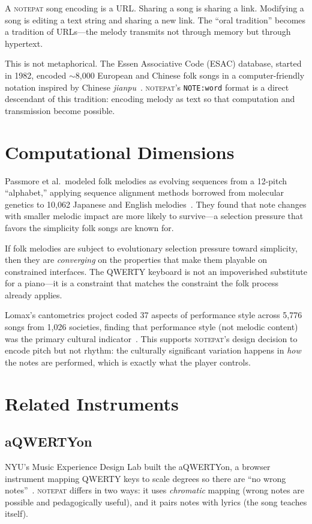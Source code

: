 \documentclass[10pt,letterpaper,twocolumn]{article}
\newcommand{\np}{\textsc{notepat}}
\begin{document}
A \np{} song encoding is a URL. Sharing a song is sharing a link. Modifying a song is editing a text string and sharing a new link. The ``oral tradition'' becomes a tradition of URLs---the melody transmits not through memory but through hypertext.

This is not metaphorical. The Essen Associative Code (ESAC) database, started in 1982, encoded $\sim$8,000 European and Chinese folk songs in a computer-friendly notation inspired by Chinese \textit{jianpu}~\citep{schaffrath1995esac}. \np{}'s \texttt{NOTE:word} format is a direct descendant of this tradition: encoding melody as text so that computation and transmission become possible.

\section{Computational Dimensions}

Passmore et al.\ modeled folk melodies as evolving sequences from a 12-pitch ``alphabet,'' applying sequence alignment methods borrowed from molecular genetics to 10,062 Japanese and English melodies~\citep{passmore2023cultural}. They found that note changes with smaller melodic impact are more likely to survive---a selection pressure that favors the simplicity folk songs are known for.

If folk melodies are subject to evolutionary selection pressure toward simplicity, then they are \emph{converging} on the properties that make them playable on constrained interfaces. The QWERTY keyboard is not an impoverished substitute for a piano---it is a constraint that matches the constraint the folk process already applies.

Lomax's cantometrics project coded 37 aspects of performance style across 5,776 songs from 1,026 societies, finding that performance style (not melodic content) was the primary cultural indicator~\citep{lomax1968folk}. This supports \np{}'s design decision to encode pitch but not rhythm: the culturally significant variation happens in \emph{how} the notes are performed, which is exactly what the player controls.

\section{Related Instruments}

\subsection{aQWERTYon}
NYU's Music Experience Design Lab built the aQWERTYon, a browser instrument mapping QWERTY keys to scale degrees so there are ``no wrong notes''~\citep{hein2017aqwertyon}. \np{} differs in two ways: it uses \emph{chromatic} mapping (wrong notes are possible and pedagogically useful), and it pairs notes with lyrics (the song teaches itself).
\end{document}
